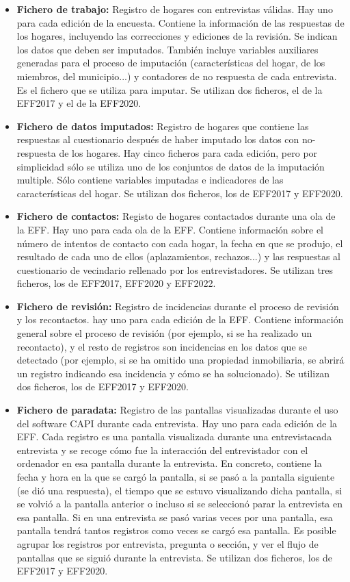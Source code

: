 \begin{itemize}
    \item \textbf{Fichero de trabajo:} Registro de hogares con entrevistas válidas. Hay uno para cada edición de la encuesta. Contiene la información de las respuestas de los hogares, incluyendo las correcciones y ediciones de la revisión. Se indican los datos que deben ser imputados. También incluye variables auxiliares generadas para el proceso de imputación (características del hogar, de los miembros, del municipio...) y contadores de no respuesta de cada entrevista. Es el fichero que se utiliza para imputar. Se utilizan dos ficheros, el de la EFF2017 y el de la EFF2020.
    \item \textbf{Fichero de datos imputados:} Registro de hogares que contiene las respuestas al cuestionario después de haber imputado los datos con no-respuesta de los hogares. Hay cinco ficheros para cada edición, pero por simplicidad sólo se utiliza uno de los conjuntos de datos de la imputación multiple. Sólo contiene variables imputadas e indicadores de las características del hogar. Se utilizan dos ficheros, los de EFF2017 y EFF2020.
    \item \textbf{Fichero de contactos:} Registo de hogares contactados durante una ola de la EFF. Hay uno para cada ola de la EFF. Contiene información sobre el número de intentos de contacto con cada hogar, la fecha en que se produjo, el resultado de cada uno de ellos (aplazamientos, rechazos...) y las respuestas al cuestionario de vecindario rellenado por los entrevistadores. Se utilizan tres ficheros, los de EFF2017, EFF2020 y EFF2022.
    \item \textbf{Fichero de revisión:} Registro de incidencias durante el proceso de revisión y los recontactos. hay uno para cada edición de la EFF. Contiene información general sobre el proceso de revisión (por ejemplo, si se ha realizado un recontacto), y el resto de registros son incidencias en los datos que se detectado (por ejemplo, si se ha omitido una propiedad inmobiliaria, se abrirá un registro indicando esa incidencia y cómo se ha solucionado). Se utilizan dos ficheros, los de EFF2017 y EFF2020.
    \item \textbf{Fichero de paradata:} Registro de las pantallas visualizadas durante el uso del software CAPI durante cada entrevista. Hay uno para cada edición de la EFF. Cada registro es una pantalla visualizada durante una entrevistacada entrevista y se recoge cómo fue la interacción del entrevistador con el ordenador en esa pantalla durante la entrevista. En concreto, contiene la fecha y hora en la que se cargó la pantalla, si se pasó a la pantalla siguiente (se dió una respuesta), el tiempo que se estuvo visualizando dicha pantalla, si se volvió a la pantalla anterior o incluso si se seleccionó parar la entrevista en esa pantalla. Si en una entrevista se pasó varias veces por una pantalla, esa pantalla tendrá tantos registros como veces se cargó esa pantalla. Es posible agrupar los registros por entrevista, pregunta o sección, y ver el flujo de pantallas que se siguió durante la entrevista. Se utilizan dos ficheros, los de EFF2017 y EFF2020.

\end{itemize}
